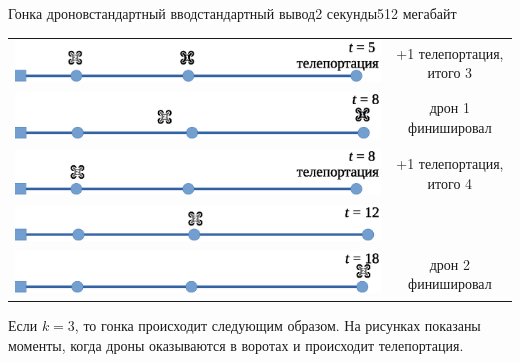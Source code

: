 \begin{problem}{Гонка дронов}{стандартный ввод}{стандартный вывод}{2 секунды}{512 мегабайт}
\begin{center}
\begin{tabular}{cc}
\includegraphics[scale=0.7]{sample-2-07.eps}&{+1 телепортация, итого 3}\\[0.8cm]
\includegraphics[scale=0.7]{sample-2-08.eps}&дрон 1 финишировал\\[0.3cm]
\includegraphics[scale=0.7]{sample-2-09.eps}&{+1 телепортация, итого 4}\\[0.8cm]
\includegraphics[scale=0.7]{sample-2-10.eps}\\[0.8cm]
\includegraphics[scale=0.7]{sample-2-11.eps}&дрон 2 финишировал\\
\end{tabular}
\end{center}

Если $k=3$, то гонка происходит следующим образом. На рисунках показаны моменты, когда дроны оказываются в воротах и происходит телепортация.



\end{problem}
